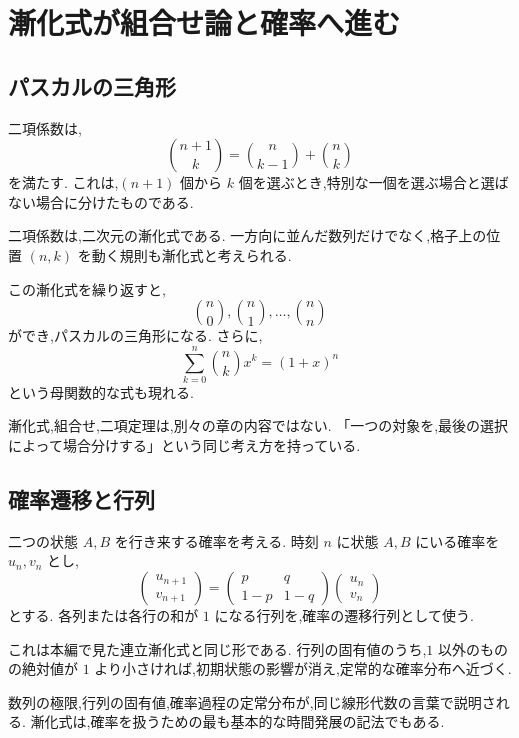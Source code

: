 
\section{漸化式が組合せ論と確率へ進む}

\subsection{パスカルの三角形}

二項係数は,
\[
  \binom{n+1}{k}
  =
  \binom{n}{k-1}+\binom{n}{k}
\]
を満たす.
これは,$(n+1)$ 個から $k$ 個を選ぶとき,特別な一個を選ぶ場合と選ばない場合に分けたものである.

二項係数は,二次元の漸化式である.
一方向に並んだ数列だけでなく,格子上の位置 $(n,k)$ を動く規則も漸化式と考えられる.

この漸化式を繰り返すと,
\[
  \binom{n}{0},\binom{n}{1},\ldots,\binom{n}{n}
\]
ができ,パスカルの三角形になる.
さらに,
\[
  \sum_{k=0}^{n}\binom{n}{k}x^k=(1+x)^n
\]
という母関数的な式も現れる.

漸化式,組合せ,二項定理は,別々の章の内容ではない.
「一つの対象を,最後の選択によって場合分けする」という同じ考え方を持っている.

\subsection{確率遷移と行列}

二つの状態 $A,B$ を行き来する確率を考える.
時刻 $n$ に状態 $A,B$ にいる確率を $u_n,v_n$ とし,
\[
  \begin{pmatrix}u_{n+1}\\v_{n+1}\end{pmatrix}
  =
  \begin{pmatrix}p&q\\1-p&1-q\end{pmatrix}
  \begin{pmatrix}u_n\\v_n\end{pmatrix}
\]
とする.
各列または各行の和が $1$ になる行列を,確率の遷移行列として使う.

これは本編で見た連立漸化式と同じ形である.
行列の固有値のうち,$1$ 以外のものの絶対値が $1$ より小さければ,初期状態の影響が消え,定常的な確率分布へ近づく.

数列の極限,行列の固有値,確率過程の定常分布が,同じ線形代数の言葉で説明される.
漸化式は,確率を扱うための最も基本的な時間発展の記法でもある.

